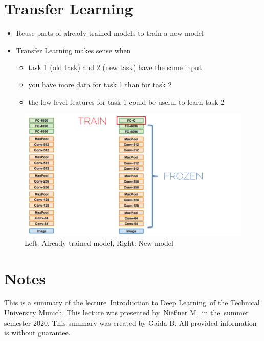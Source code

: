 \documentclass[10pt,a4paper]{article}
\newcommand{\lecture}{Introduction to Deep Learning} %
\newcommand{\lecturer}{Nießner M.} %
\newcommand{\semseter}{summer semester 2020} %
\begin{document}
\pagebreak
\section{Transfer Learning}
\begin{itemize}
	\item Reuse parts of already trained models to train a new model
	\item Transfer Learning makes sense when
	\begin{itemize}
		\item task 1 (old task) and 2 (new task) have the same input
		\item you have more data for task 1 than for task 2
		\item the low-level features for task 1 could be useful to learn task 2
	\end{itemize}
\end{itemize}

\begin{figure}[H]
	\includegraphics[width=0.8\columnwidth]{figures/transfer_learning.png}
	\caption*{Left: Already trained model, Right: New model}
\end{figure}










\pagebreak
\section*{Notes}
This is a summary of the lecture~\lecture~of the Technical University Munich.
This lecture was presented by~\lecturer~in the~\semseter.
This summary was created by Gaida B.
All provided information is without guarantee.


\end{document}
